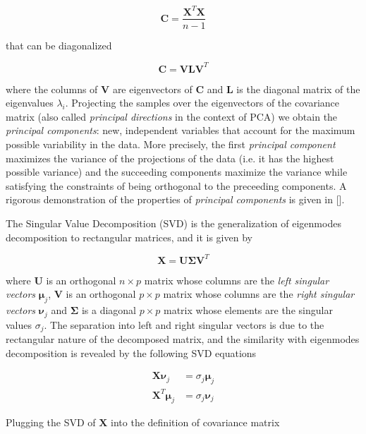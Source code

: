 \documentclass[notitlepage]{revtex4-1}
\begin{document}
\begin{equation}
\mathbf{C} = \frac{\mathbf{X}^T \mathbf{X}}{n-1}
\end{equation}

that can be diagonalized

\begin{equation}
\mathbf{C} = \mathbf{V L V}^T
\end{equation}

where the columns of \(\mathbf{V}\) are eigenvectors of \(\mathbf{C}\) and \(\mathbf{L}\) is the diagonal matrix of the eigenvalues \(\lambda_i\). Projecting the samples over the eigenvectors of the covariance matrix (also called \textit{principal directions} in the context of PCA) we obtain the \textit{principal components}: new, independent variables that account for the maximum possible variability in the data. More precisely, the first \textit{principal component} maximizes the variance of the projections of the data (i.e. it has the highest possible variance) and the succeeding components maximize the variance while satisfying the constraints of being orthogonal to the preceeding components. A rigorous demonstration of the properties of \textit{principal components} is given in [].

The Singular Value Decomposition (SVD) is the generalization of eigenmodes decomposition to rectangular matrices, and it is given by

\begin{equation}
\mathbf{X} = \mathbf{U \Sigma} \mathbf{V}^T
\end{equation}

where \(\mathbf{U}\) is an orthogonal \(n \times p\)  matrix whose columns are the \textit{left singular vectors} \(\mathbf{\mu}_j \), \(\mathbf{V}\) is an orthogonal \(p \times p\) matrix whose columns are the \textit{right singular vectors} \( \mathbf{\nu}_j \) and \( \mathbf{\Sigma} \) is a diagonal \(p \times p\) matrix whose elements are the singular values \(\sigma_j\). The separation into left and right singular vectors is due to the rectangular nature of the decomposed matrix, and the similarity with eigenmodes decomposition is revealed by the following SVD equations

\begin{align}
\mathbf{X} \mathbf{\nu}_j & = \sigma_j \mathbf{\mu}_j \\
\mathbf{X}^T \mathbf{\mu}_j & = \sigma_j \mathbf{\nu}_j
\end{align}

Plugging the SVD of \(\mathbf{X}\) into the definition of covariance matrix
\end{document}
